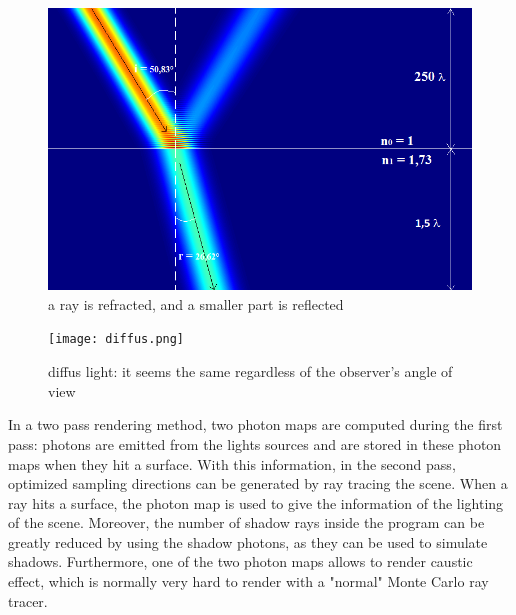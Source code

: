 \documentclass[12pt]{article}
\numberwithin{equation}{section}
\begin{document}
\begin{figure}
  \begin{center}
    \includegraphics[scale=0.3]{RefractionModelisation.png}
    \caption{a ray is refracted, and a smaller part is reflected}
    \label{fig:2}
  \end{center}
\end{figure}

\begin{figure}
  \begin{center}
    \texttt{[image: diffus.png]}
    \caption{diffus light: it seems the same regardless of the observer's angle of view }
    \label{fig:3}
  \end{center}
\end{figure}

In a two pass rendering method, two photon maps are computed during the first pass: photons are emitted from the lights sources and are stored in these photon maps when they hit a surface. With this information, in the second pass, optimized sampling directions can be generated by ray tracing the scene. When a ray hits a surface, the photon map is used to give the information of the lighting of the scene. Moreover, the number of shadow rays inside the program can be greatly reduced by using the shadow photons, as they can be used to simulate shadows. Furthermore, one of the two photon maps allows to render caustic effect, which is normally very hard to render with a "normal" Monte Carlo ray tracer.\\
\end{document}
